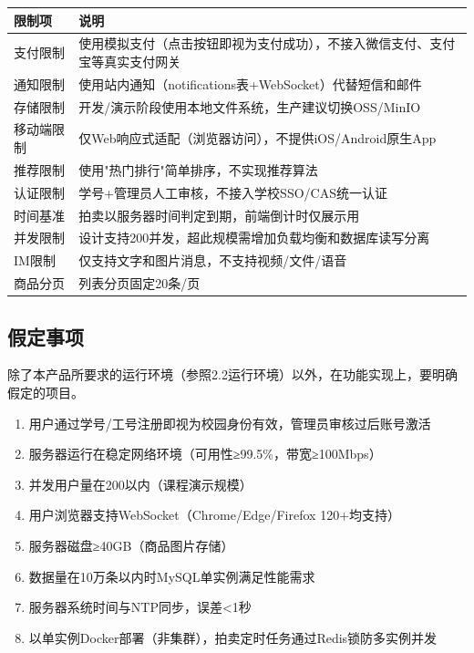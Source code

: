 \documentclass[12pt,a4paper]{ctexart}
\numberwithin{figure}{section}
\numberwithin{table}{section}
\begin{document}
\begin{center}
\renewcommand{\arraystretch}{1.3}
\begin{tabular}{|p{4cm}|p{10cm}|}
\hline
\rowcolor{tableheader}
\textbf{限制项} & \textbf{说明} \\
\hline
支付限制 & 使用模拟支付（点击按钮即视为支付成功），不接入微信支付、支付宝等真实支付网关 \\
\hline
通知限制 & 使用站内通知（notifications表+WebSocket）代替短信和邮件 \\
\hline
存储限制 & 开发/演示阶段使用本地文件系统，生产建议切换OSS/MinIO \\
\hline
移动端限制 & 仅Web响应式适配（浏览器访问），不提供iOS/Android原生App \\
\hline
推荐限制 & 使用"热门排行"简单排序，不实现推荐算法 \\
\hline
认证限制 & 学号+管理员人工审核，不接入学校SSO/CAS统一认证 \\
\hline
时间基准 & 拍卖以服务器时间判定到期，前端倒计时仅展示用 \\
\hline
并发限制 & 设计支持200并发，超此规模需增加负载均衡和数据库读写分离 \\
\hline
IM限制 & 仅支持文字和图片消息，不支持视频/文件/语音 \\
\hline
商品分页 & 列表分页固定20条/页 \\
\hline
\end{tabular}
\end{center}

\subsection{假定事项}

除了本产品所要求的运行环境（参照2.2运行环境）以外，在功能实现上，要明确假定的项目。

\begin{enumerate}
    \item 用户通过学号/工号注册即视为校园身份有效，管理员审核过后账号激活
    \item 服务器运行在稳定网络环境（可用性≥99.5\%，带宽≥100Mbps）
    \item 并发用户量在200以内（课程演示规模）
    \item 用户浏览器支持WebSocket（Chrome/Edge/Firefox 120+均支持）
    \item 服务器磁盘≥40GB（商品图片存储）
    \item 数据量在10万条以内时MySQL单实例满足性能需求
    \item 服务器系统时间与NTP同步，误差<1秒
    \item 以单实例Docker部署（非集群），拍卖定时任务通过Redis锁防多实例并发
\end{enumerate}
\end{document}
